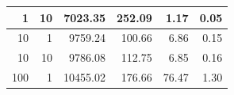 \documentclass[12pt,a4paper,twoside,openright]{report}
\begin{document}
\begin{table}[H]
\begin{tabular}{|r|r|r|r|r|r|}
1                                                                                               & 10                                                                                                                      & 7023.35                                                                                                                                    & 252.09                                                                                                                               & 1.17                                                                                                  & 0.05                                                                                                                               \\ \hline
10                                                                                              & 1                                                                                                                       & 9759.24                                                                                                                                    & 100.66                                                                                                                               & 6.86                                                                                                  & 0.15                                                                                                                               \\ \hline
10                                                                                              & 10                                                                                                                      & 9786.08                                                                                                                                    & 112.75                                                                                                                               & 6.85                                                                                                  & 0.16                                                                                                                               \\ \hline
100                                                                                             & 1                                                                                                                       & 10455.02                                                                                                                                   & 176.66                                                                                                                               & 76.47                                                                                                 & 1.30                                                                                                                               \\ \hline

\end{tabular}
\end{table}
\end{document}
